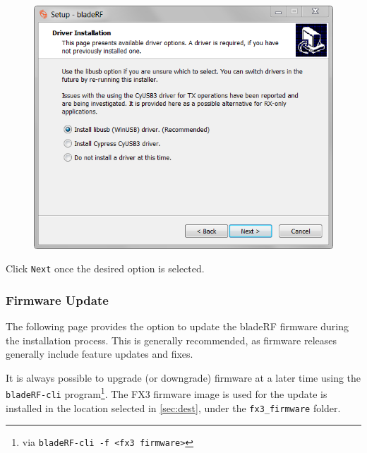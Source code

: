 {\begin{figure}[h]
  \centering
  \includegraphics{images/windows/installer/03-driver.png}
\end{figure}

Click \texttt{Next} once the desired option is selected.

\newpage
\subsubsection{Firmware Update} \label{sec:fwupdate}

The following page provides the option to update the bladeRF firmware during
the installation process. This is generally recommended, as firmware releases
generally include feature updates and fixes.

It is always possible to upgrade (or downgrade) firmware at a later time using
the \texttt{bladeRF-cli} program\footnote{via \texttt{bladeRF-cli -f <fx3
firmware>}}. The FX3 firmware image is used for the update is installed in the
location selected in \ref{sec:dest}, under the \texttt{fx3\_firmware} folder.

}
